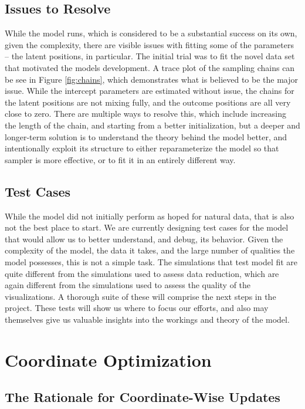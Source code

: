 \documentclass[11pt]{scrartcl}
\begin{document}
\subsection{Issues to Resolve}
While the model runs, which is considered to be a substantial success on its own, given the complexity, there are visible issues with fitting some of the parameters -- the latent positions, in particular. The initial trial was to fit the novel data set that motivated the models development. A trace plot of the sampling chains can be see in Figure \ref{fig:chains}, which demonstrates what is believed to be the major issue. While the intercept parameters are estimated without issue, the chains for the latent positions are not mixing fully, and the outcome positions are all very close to zero. There are multiple ways to resolve this, which include increasing the length of the chain, and starting from a better initialization, but a deeper and longer-term solution is to understand the theory behind the model better, and intentionally exploit its structure to either reparameterize the model so that sampler is more effective, or to fit it in an entirely different way. 

\subsection{Test Cases}
While the model did not initially perform as hoped for natural data, that is also not the best place to start. We are currently designing test cases for the model that would allow us to better understand, and debug, its behavior. Given the complexity of the model, the data it takes, and the large number of qualities the model possesses, this is not a simple task. The simulations that test model fit are quite different from the simulations used to assess data reduction, which are again different from the simulations used to assess the quality of the visualizations. A thorough suite of these will comprise the next steps in the project. These tests will show us where to focus our efforts, and also may themselves give us valuable insights into the workings and theory of the model.

\section{Coordinate Optimization}

\subsection{The Rationale for Coordinate-Wise Updates}
\end{document}
